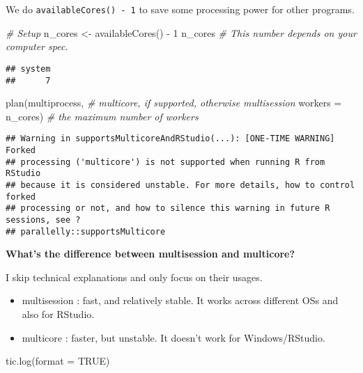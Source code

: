 \documentclass[
]{book}
\newenvironment{Shaded}{\begin{snugshade}}{\end{snugshade}}
\newcommand{\AttributeTok}[1]{\textcolor[rgb]{0.77,0.63,0.00}{#1}}
\newcommand{\CommentTok}[1]{\textcolor[rgb]{0.56,0.35,0.01}{\textit{#1}}}
\newcommand{\ConstantTok}[1]{\textcolor[rgb]{0.00,0.00,0.00}{#1}}
\newcommand{\DecValTok}[1]{\textcolor[rgb]{0.00,0.00,0.81}{#1}}
\newcommand{\FunctionTok}[1]{\textcolor[rgb]{0.00,0.00,0.00}{#1}}
\newcommand{\NormalTok}[1]{#1}
\newcommand{\OtherTok}[1]{\textcolor[rgb]{0.56,0.35,0.01}{#1}}
\newcommand{\SpecialCharTok}[1]{\textcolor[rgb]{0.00,0.00,0.00}{#1}}
\providecommand{\tightlist}{%
  \setlength{\itemsep}{0pt}\setlength{\parskip}{0pt}}
\begin{document}
We do \texttt{availableCores()\ -\ 1} to save some processing power for other programs.

\begin{Shaded}
\begin{Highlighting}[]
\CommentTok{\# Setup }
\NormalTok{n\_cores }\OtherTok{\textless{}{-}} \FunctionTok{availableCores}\NormalTok{() }\SpecialCharTok{{-}} \DecValTok{1}
\NormalTok{n\_cores }\CommentTok{\# This number depends on your computer spec.}
\end{Highlighting}
\end{Shaded}

\begin{verbatim}
## system 
##      7
\end{verbatim}

\begin{Shaded}
\begin{Highlighting}[]
\FunctionTok{plan}\NormalTok{(multiprocess, }\CommentTok{\# multicore, if supported, otherwise multisession}
     \AttributeTok{workers =}\NormalTok{ n\_cores) }\CommentTok{\# the maximum number of workers}
\end{Highlighting}
\end{Shaded}

\begin{verbatim}
## Warning in supportsMulticoreAndRStudio(...): [ONE-TIME WARNING] Forked
## processing ('multicore') is not supported when running R from RStudio
## because it is considered unstable. For more details, how to control forked
## processing or not, and how to silence this warning in future R sessions, see ?
## parallelly::supportsMulticore
\end{verbatim}

\textbf{What's the difference between multisession and multicore?}

I skip technical explanations and only focus on their usages.

\begin{itemize}
\tightlist
\item
  multisession : fast, and relatively stable. It works across different OSs and also for RStudio.
\item
  multicore : faster, but unstable. It doesn't work for Windows/RStudio.
\end{itemize}

\begin{Shaded}
\begin{Highlighting}[]
\FunctionTok{tic.log}\NormalTok{(}\AttributeTok{format =} \ConstantTok{TRUE}\NormalTok{)}
\end{Highlighting}
\end{Shaded}
\end{document}
